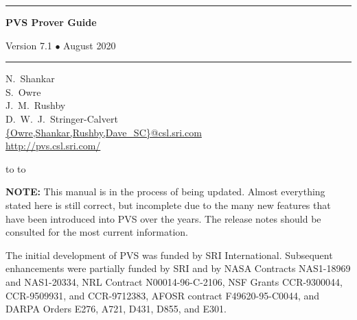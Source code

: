 \documentclass[12pt]{book}
\begin{document}
\begin{titlepage}
\vspace*{1in}
\noindent
\rule[1pt]{\textwidth}{2pt}
\begin{center}
\textbf{\pvstitle PVS Prover Guide}
\end{center}
\begin{flushright}
{\Large Version 7.1 {\smaller$\bullet$} August 2020}
\end{flushright}
\rule[1in]{\textwidth}{2pt}
\vspace*{2in}
\begin{flushleft}
N.~Shankar\\
S.~Owre\\
J.~M.~Rushby\\
D.~W.~J.~Stringer-Calvert\\
{\smaller\url{{Owre,Shankar,Rushby,Dave_SC}@csl.sri.com}}\\
{\smaller\url{http://pvs.csl.sri.com/}}
\end{flushleft}
\vspace*{1in}
\vbox{\hbox to %
\hbox to }
\end{titlepage}

\pagestyle{fancy}
\renewcommand{\chaptermark}[1]{\markboth{\emph{#1}}{}\markright{\emph{#1}}}
\renewcommand{\sectionmark}[1]{\markright{\thesection \em \ #1}}
\lhead[\thepage]{\rightmark}
\cfoot{}
\rhead[\leftmark]{\thepage}
\setcounter{secnumdepth}{1} 
\setcounter{tocdepth}{2}
\thispagestyle{empty}

\newpage
\renewcommand{\thepage}{ack}

\noindent\textbf{NOTE:} This manual is in the process of being updated.
Almost everything stated here is still correct, but incomplete due to the
many new features that have been introduced into PVS over the years.  The
release notes should be consulted for the most current information.

\vspace*{6in}\noindent
The initial development of PVS was funded by SRI International.
Subsequent enhancements were partially funded by SRI and by NASA
Contracts NAS1-18969 and NAS1-20334, NRL Contract N00014-96-C-2106,
NSF Grants CCR-9300044, CCR-9509931, and CCR-9712383, AFOSR contract
F49620-95-C0044, and DARPA Orders E276, A721, D431, D855, and E301.
\newpage\setcounter{page}{1}
\end{document}
